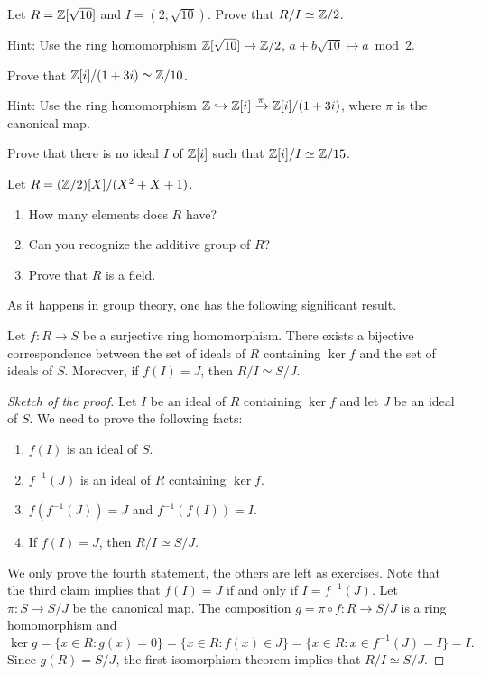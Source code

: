 \begin{exercise}
	\label{xca:Z[sqrt10]/(2,sqrt10)}
	Let $R=\mathbb{Z}[\sqrt{10}]$ and $I=(2,\sqrt{10})$. Prove that $R/I\simeq\mathbb{Z}/2$. 	
\end{exercise}

Hint: Use the ring homomorphism $\mathbb{Z}[\sqrt{10}]\to\mathbb{Z}/2$, $a+b\sqrt{10}\mapsto a\bmod 2$. 	

\begin{exercise}
\label{xca:Z[i]/(1+3i)}
	Prove that $\mathbb{Z}[i]/(1+3i)\simeq\mathbb{Z}/10$. 	
\end{exercise}

Hint: Use 
the ring homomorphism $\mathbb{Z}\hookrightarrow\mathbb{Z}[i]\xrightarrow{\pi}\mathbb{Z}[i]/(1+3i)$, where
$\pi$ is the canonical map. 

\begin{exercise}
	Prove that there is no ideal $I$ of $\mathbb{Z}[i]$ 
	such that $\mathbb{Z}[i]/I\simeq\mathbb{Z}/15$. 
\end{exercise}

\begin{exercise}
	Let $R=(\mathbb{Z}/2)[X]/(X^2+X+1)$. 
	\begin{enumerate}
		\item How many elements does $R$ have?
		\item Can you recognize the additive group of $R$?
		\item Prove that $R$ is a field. 	
	\end{enumerate}
\end{exercise}

As it happens in group theory, one has the following significant result. 

\begin{theorem}
\label{thm:ring_correspondence}
	Let $f\colon R\to S$ be a surjective ring homomorphism. There exists a
	bijective correspondence between 
	the set of ideals of $R$ containing $\ker f$ and
	the set of ideals of $S$.  Moreover, if $f(I)=J$, then
	$R/I\simeq S/J$. 
\end{theorem}

\begin{proof}[Sketch of the proof]
Let $I$ be an ideal of $R$ containing $\ker f$ and
let $J$ be an ideal of $S$. 
We need to prove the following facts:
\begin{enumerate}
\item $f(I)$ is an ideal of $S$.
\item $f^{-1}(J)$ is an ideal of $R$ containing $\ker f$. 
\item $f(f^{-1}(J))=J$ and $f^{-1}(f(I))=I$. 
\item If $f(I)=J$, then $R/I\simeq S/J$. 
\end{enumerate}
We only prove the fourth statement, the others are left as exercises. Note that
the third claim implies that $f(I)=J$ if and only if $I=f^{-1}(J)$. 
Let 
$\pi\colon S\to S/J$ be the canonical map. The composition
$g=\pi\circ f\colon R\to S/J$ is a ring homomorphism and
\[
\ker g=\{x\in R:g(x)=0\}=\{x\in R:f(x)\in J\}=\{x\in R:x\in f^{-1}(J)=I\}=I.
\]
Since $g(R)=S/J$, the first isomorphism theorem implies that $R/I\simeq S/J$.
\end{proof}

